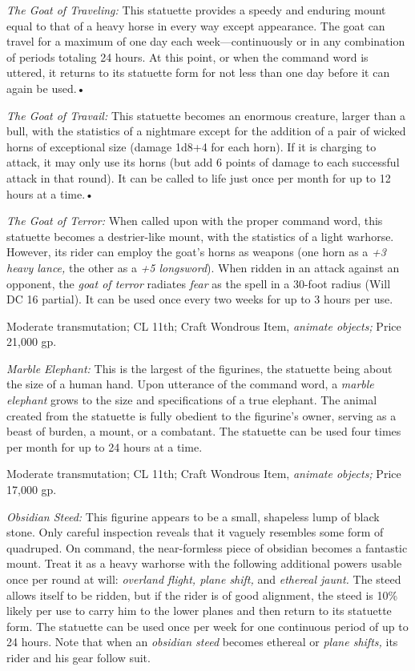 \textit{The Goat of Traveling: }This statuette provides a speedy and enduring mount 
equal to that of a heavy horse in every way except appearance. The goat can travel 
for a maximum of one day each week---continuously or in any combination of periods 
totaling 24 hours. At this point, or when the command word is uttered, it returns 
to its statuette form for not less than one day before it can again be used.•

\textit{The Goat of Travail: }This statuette becomes an enormous creature, larger 
than a bull, with the statistics of a nightmare except for the addition of a pair 
of wicked horns of exceptional size (damage 1d8+4 for each horn). If it is charging 
to attack, it may only use its horns (but add 6 points of damage to each successful 
attack in that round). It can be called to life just once per month for up to 12 
hours at a time.•

\textit{The Goat of Terror: }When called upon with the proper command word, this 
statuette becomes a destrier-like mount, with the statistics of a light warhorse. 
However, its rider can employ the goat's horns as weapons (one horn as a \textit{+3 
heavy lance, }the other as a \textit{+5 longsword}). When ridden in an attack against 
an opponent, the \textit{goat of terror }radiates \textit{fear }as the spell in 
a 30-foot radius (Will DC 16 partial). It can be used once every two weeks for 
up to 3 hours per use.

Moderate transmutation; CL 11th; Craft Wondrous Item, \textit{animate objects; 
}Price 21,000 gp.

\textit{Marble Elephant: }This is the largest of the figurines, the statuette being 
about the size of a human hand. Upon utterance of the command word, a \textit{marble 
elephant }grows to the size and specifications of a true elephant. The animal created 
from the statuette is fully obedient to the figurine's owner, serving as a beast 
of burden, a mount, or a combatant. The statuette can be used four times per month 
for up to 24 hours at a time.

Moderate transmutation; CL 11th; Craft Wondrous Item, \textit{animate objects; 
}Price 17,000 gp.

\textit{Obsidian Steed: }This figurine appears to be a small, shapeless lump of 
black stone. Only careful inspection reveals that it vaguely resembles some form 
of quadruped. On command, the near-formless piece of obsidian becomes a fantastic 
mount. Treat it as a heavy warhorse with the following additional powers usable 
once per round at will: \textit{overland flight, plane shift, }and \textit{ethereal 
jaunt. }The steed allows itself to be ridden, but if the rider is of good alignment, 
the steed is 10\% likely per use to carry him to the lower planes and then return 
to its statuette form. The statuette can be used once per week for one continuous 
period of up to 24 hours. Note that when an \textit{obsidian steed }becomes ethereal 
or \textit{plane shifts, }its rider and his gear follow suit.

